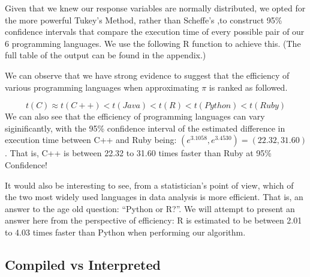 \documentclass[12pt,halfline,a4paper,]{ouparticle}
\begin{document}
Given that we knew our response variables are normally distributed, we
opted for the more powerful Tukey's Method, rather than Scheffe's ,to
construct 95\% confidence intervals that compare the execution time of
every possible pair of our 6 programming languages. We use the following
R function to achieve this. (The full table of the output can be found
in the appendix.)

We can observe that we have strong evidence to suggest that the
efficiency of various programming languages when approximating \(\pi\)
is ranked as followed.

\[
t(C) \approx t(C++) < t(Java) < t(R) < t(Python) < t(Ruby)
\] We can also see that the efficiency of programming languages can vary
siginificantly, with the 95\% confidence interval of the estimated
difference in execution time between C++ and Ruby being:
\((e^{3.1058}, e^{3.4530}) = (22.32, 31.60)\). That is, C++ is between
22.32 to 31.60 times faster than Ruby at 95\% Confidence!

It would also be interesting to see, from a statistician's point of
view, which of the two most widely used languages in data analysis is
more efficient. That is, an answer to the age old question: ``Python or
R?''. We will attempt to present an answer here from the perspective of
efficiency: R is estimated to be between 2.01 to 4.03 times faster than
Python when performing our algorithm.

\hypertarget{compiled-vs-interpreted}{%
\subsection{Compiled vs Interpreted}\label{compiled-vs-interpreted}}
\end{document}
